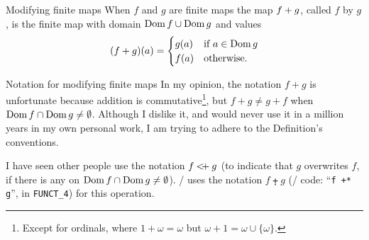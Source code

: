 \begin{definition}{Modifying finite maps}\label{defn:static-core:modifying-finite-maps}
When $f$ and $g$ are finite maps the map $f + g$, called
$f$  by $g$, is the finite map with domain
$\mathop{\rm Dom}\nolimits f \cup \mathop{\rm Dom}\nolimits g$ and values
\begin{equation*}
  (f + g)(a) = \begin{cases}g(a) & \mbox{if $a\in\mathop{\rm Dom}\nolimits g$}\\
    f(a) & \mbox{otherwise}.
  \end{cases}
\end{equation*}
\end{definition}

\begin{remark}{Notation for modifying finite maps}
In my opinion, the notation $f+g$ is unfortunate because addition is
commutative\footnote{Except for ordinals, where $1+\omega=\omega$ but $\omega+1=\omega\cup\{\omega\}$.}, but $f+g\neq g+f$ when
$\mathop{\rm Dom}\nolimits f\cap\mathop{\rm Dom}\nolimits g\neq\emptyset$. Although I dislike it, and would never
use it in a million years in my own personal work, I am trying to adhere
to the Definition's conventions.

I have seen other people use the notation $f\mathbin{{<}\mskip-4mu{+}}g$ (to indicate
that $g$ overwrites $f$, if there is any on $\mathop{\rm Dom}\nolimits f\cap\mathop{\rm Dom}\nolimits g\neq\emptyset$).
\Mizar/ uses the notation $f\plusdot g$ (\Mizar/ code: ``\verb|f +* g|'', in
\verb|FUNCT_4|) for this operation.
\end{remark}

